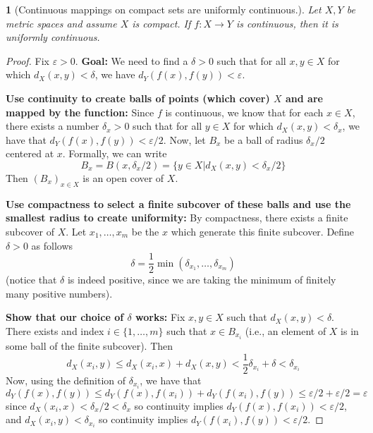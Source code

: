 \documentclass[12pt]{article}
\numberwithin{equation}{section}
\theoremstyle{plain}
\newtheorem{theorem}{\color{ForestGreen}{\textbf{Theorem}}}[section]
\theoremstyle{definition}
\newcommand{\1}{\mathbbm 1}
\def\d{\delta}
\newcommand{\e}{\varepsilon}
\begin{document}
\begin{theorem}[Continuous mappings on compact sets are uniformly continuous.]
	Let $X,Y$ be metric spaces and assume $X$ is compact. If $f: X \to Y$ is continuous, then it is uniformly continuous. 
\end{theorem}
\begin{proof}
	Fix $\e > 0$. \textbf{Goal:} We need to find a $\d > 0$ such that for all $x,y \in X$ for which $d_X(x,y) < \d$, we have $d_Y(f(x),f(y)) < \e$. 

	\textbf{Use continuity to create balls of points (which cover) $X$ and are mapped by the function:} Since $f$ is continuous, we know that for each $x \in X$, there exists a number $\d_x > 0$ such that for all $y \in X$ for which $d_X(x,y) < \d_x$, we have that $d_Y(f(x),f(y)) < \e/2$. Now, let $B_x$ be a ball of radius $\d_x/2$ centered at $x$. Formally, we can write
	\begin{equation*}
		B_x = B(x, \d_x / 2) = \{y \in X | d_X(x,y) < \d_x /2 \} 
	\end{equation*}
	Then $(B_x)_{x\in X}$ is an open cover of $X$. 

	\textbf{Use compactness to select a finite subcover of these balls and use the smallest radius to create uniformity:} By compactness, there exists a finite subcover of $X$. Let $x_1, \ldots, x_m$ be the $x$ which generate this finite subcover. Define $\d > 0$ as follows
	\begin{equation}
		\d = \frac{1}{2} \min (\d_{x_1}, \ldots, \d_{x_m})
	\end{equation}
	(notice that $\d$ is indeed positive, since we are taking the minimum of finitely many positive numbers).

	\textbf{Show that our choice of $\d$ works:} Fix $x,y \in X$ such that $d_X(x,y) < \d$. There exists and index $i \in \{1, \ldots, m\}$ such that $x \in B_{x_i}$ (i.e., an element of $X$ is in some ball of the finite subcover). Then
	\begin{equation}
		d_X(x_i,y) \leq d_X(x_i, x) + d_X(x,y) < \frac{1}{2} \d_{x_i} + \d < \d_{x_i} 
	\end{equation} 
	Now, using the definition of $\d_{x_i}$, we have that
	\begin{equation}
		d_Y(f(x),f(y)) \leq d_Y(f(x),f(x_i)) + d_Y(f(x_i),f(y)) \leq \e/2 + \e/2 = \e
	\end{equation}
	since $d_X(x_i, x) < \d_x / 2 < \delta_x$ so continuity implies $d_Y(f(x),f(x_i)) < \e / 2$, and  $d_X(x_i,y) < \d_{x_i}$ so continuity implies  $d_Y(f(x_i),f(y)) < \e /2$.
\end{proof}
\end{document}
